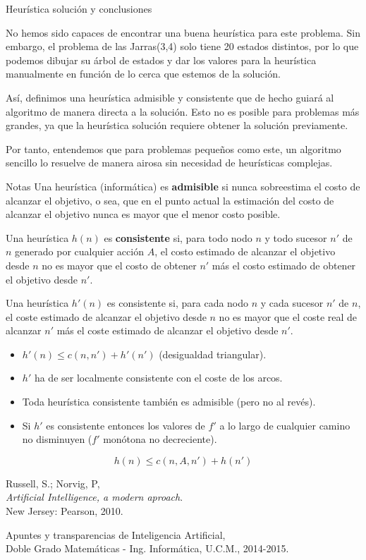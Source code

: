 \documentclass[11pt, a4paper, spanish, openright, twoside]{book}
\begin{document}
\begin{section}{Heurística solución y conclusiones}

No hemos sido capaces de encontrar una buena heurística para este problema. Sin embargo, el problema de las Jarras(3,4) solo tiene 20 estados distintos, por lo que podemos dibujar su árbol de estados y dar los valores para la heurística manualmente en función de lo cerca que estemos de la solución.

Así, definimos una heurística admisible y consistente que de hecho guiará al algoritmo de manera directa a la solución. Esto no es posible para problemas más grandes, ya que la heurística solución requiere obtener la solución previamente.

Por tanto, entendemos que para problemas pequeños como este, un algoritmo sencillo lo resuelve de manera airosa sin necesidad de heurísticas complejas. 

\end{section}

\begin{section}{Notas}
	Una heurística (informática) es \textbf{admisible} si nunca sobreestima el costo de alcanzar el objetivo, o sea, 
que en el punto actual la estimación del costo de alcanzar el objetivo nunca es mayor que el menor costo posible.

	Una heurística $h(n)$ es \textbf{consistente} si, para todo nodo $n$ y todo sucesor $n'$ de $n$ generado por cualquier acción $A$, el costo estimado de alcanzar el objetivo desde $n$ no es mayor que el costo de obtener $n'$ más el costo estimado de obtener el objetivo desde $n'$.

	Una heurística $h'(n)$ es consistente si, para cada nodo $n$ y cada sucesor $n'$ de $n$, el coste 
	estimado de alcanzar el objetivo desde $n$ no es mayor que el coste real de 
	alcanzar $n'$ más el coste estimado de alcanzar el objetivo desde $n'$.
		\begin{itemize}
		\item  $h'(n) \le c(n, n') + h'(n')$ (desigualdad triangular).
		\item  $h'$  ha de ser localmente consistente con el coste de los arcos.
		\item Toda heurística consistente también es admisible (pero no al revés).
		\item Si $h'$ es consistente entonces los valores de $f'$ a lo largo de cualquier 
		camino no disminuyen ($f'$ monótona no decreciente).
		\end{itemize}

$$\boxed{h(n) \le c(n, A, n') + h(n')}$$
\end{section}

\begin{thebibliography}{9}

	Russell, S.; Norvig, P, \\
	\emph{Artificial Intelligence, a modern aproach}.\\
	New Jersey: Pearson, 2010.
	
	Apuntes y transparencias de Inteligencia Artificial, \\
	Doble Grado Matemáticas - Ing. Informática, U.C.M., 2014-2015.

\end{thebibliography}
\end{document}
